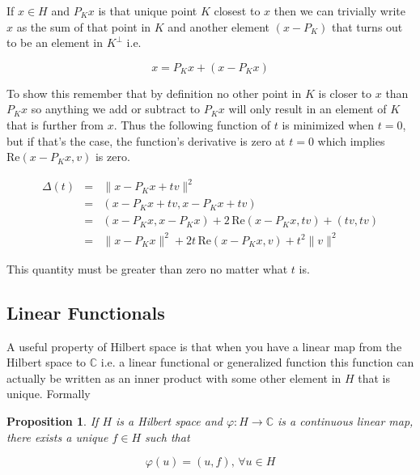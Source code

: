 \documentclass[oneside]{book}
\newtheorem{proposition}[theorem]{Proposition}
\begin{document}
If $x \in H$ and $P_K x$ is that unique point $K$ closest to $x$ then we can trivially write $x$ as the sum of that point in $K$ and another element $(x-P_K)$ that turns out to be an element in $K^\perp$ i.e.

\begin{equation}
x = P_K x + (x-P_Kx)
\end{equation}

To show this remember that by definition no other point in $K$ is closer to $x$ than $P_Kx$ so anything we add or subtract to $P_Kx$ will only result in an element of $K$ that is further from $x$. Thus the following function of $t$ is minimized when $t=0$, but if that's the case, the function's derivative is zero at $t=0$ which implies $\mathrm{Re}(x-P_Kx,v)$ is zero. 

\begin{eqnarray}
\Delta(t) &=& \|x-P_K x + tv\|^2\nonumber\\
&=& (x-P_Kx+tv,x-P_Kx+tv)\nonumber\\
&=& (x-P_Kx,x-P_Kx) + 2\,\mathrm{Re}(x-P_Kx,tv) +(tv,tv)\nonumber\\
&=& \|x-P_Kx\|^2 + 2t\,\mathrm{Re}(x-P_Kx,v) +t^2 \|v\|^2
\end{eqnarray}

This quantity must be greater than zero no matter what $t$ is. 

\subsection{Linear Functionals}
A useful property of Hilbert space is that when you have a linear map from the Hilbert space to $\mathbb{C}$ i.e. a linear functional or generalized function this function can actually be written as an inner product with some other element in $H$ that is unique. Formally

\begin{proposition}
If $H$ is a Hilbert space and $\varphi: H \to \mathbb{C}$ is a continuous linear map, there exists a unique $f \in H$ such that

\begin{equation}
\varphi(u) = (u,f),\, \forall u \in H
\end{equation}
\end{proposition}
\end{document}
